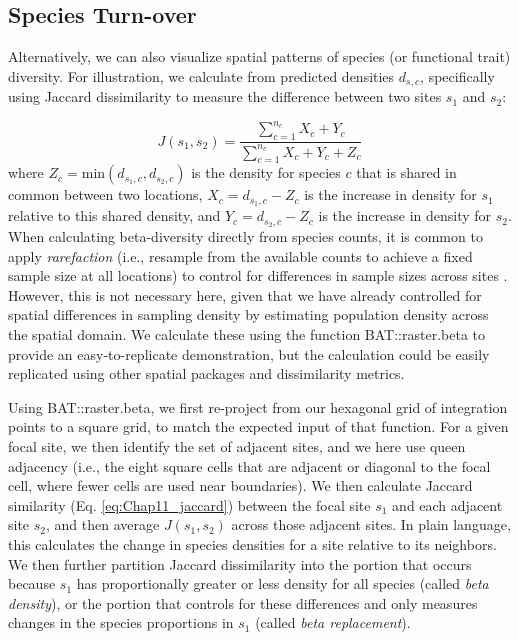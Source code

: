 \subsection{Species Turn-over}

Alternatively, we can also visualize spatial patterns of species (or functional trait) diversity.  For illustration, we calculate  from predicted densities \( d_{s,c} \), specifically using Jaccard dissimilarity \cite{jaccard_distribution_1912} to measure the difference between two sites \(s_1\) and \(s_2\):

\begin{equation} \label{eq:Chap11_jaccard}
    J(s_1,s_2) = \frac{\sum_{c=1}^{n_c} X_c + Y_c }{\sum_{c=1}^{n_c} X_c + Y_c + Z_c }
\end{equation}
where \( Z_c = \mathrm{min}(d_{s_1,c}, d_{s_2,c}) \) is the density for species \(c\) that is shared in common between two locations, \( X_c = d_{s_1,c} - Z_c \) is the increase in density for \(s_1\) relative to this shared density, and \( Y_c = d_{s_2,c} - Z_c \) is the increase in density for \(s_2\).  When calculating beta-diversity directly from species counts, it is common to apply \textit{rarefaction} (i.e., resample from the available counts to achieve a fixed sample size at all locations) to control for differences in sample sizes across sites \cite{sanders_marine_1968}.  However, this is not necessary here, given that we have already controlled for spatial differences in sampling density by estimating population density across the spatial domain.  We calculate these using the function \colorbox{backcolour}{BAT::raster.beta} \cite{cardoso_bat_2015} to provide an easy-to-replicate demonstration, but the calculation could be easily replicated using other spatial packages and dissimilarity metrics. 

Using \colorbox{backcolour}{BAT::raster.beta}, we first re-project from our hexagonal grid of integration points to a square grid, to match the expected input of that function.  For a given focal site, we then identify the set of adjacent sites, and we here use queen adjacency (i.e., the eight square cells that are adjacent or diagonal to the focal cell, where fewer cells are used near boundaries).  We then calculate Jaccard similarity (Eq. \ref{eq:Chap11_jaccard}) between the focal site \(s_1\) and each adjacent site \(s_2\), and then average \( J(s_1,s_2) \) across those adjacent sites.  In plain language, this calculates the change in species densities for a site relative to its neighbors.  We then further partition Jaccard dissimilarity into the portion that occurs because \(s_1\) has proportionally greater or less density for all species (called \textit{beta density}), or the portion that controls for these differences and only measures changes in the species proportions in \(s_1\) (called \textit{beta replacement}).   

